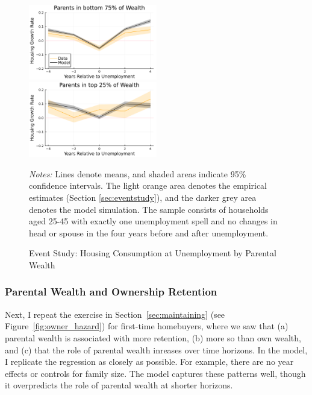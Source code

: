 \documentclass[12pt]{article}
\begin{document}
\begin{figure}[tb]
	\caption{Event Study: Housing Consumption at Unemployment by Parental Wealth}\label{fig:housinggrowthrates_model}
	\includegraphics[width=0.5\textwidth]{../tabfig/model_housinggrowthpoor_both}%
	\includegraphics[width=0.5\textwidth]{../tabfig/model_housinggrowthrich_both}
	
	{\begin{footnotesize} \textit{Notes:} Lines denote means, and shaded areas indicate 95\% confidence intervals. The light orange area denotes the empirical estimates (Section \ref{sec:eventstudy}), and the darker grey area denotes the model simulation. The sample consists of households aged 25-45 with exactly one unemployment spell and no changes in head or spouse in the four years before and after unemployment. \end{footnotesize}}
\end{figure}


\subsubsection{Parental Wealth and Ownership Retention}
Next, I repeat the exercise in Section~\ref{sec:maintaining} (see Figure~\ref{fig:owner_hazard}) for first-time homebuyers, where we saw that (a) parental wealth is associated with more retention, (b) more so than own wealth, and (c) that the role of parental wealth inreases over time horizons. In the model, I replicate the regression as closely as possible. For example, there are no year effects or controls for family size. The model captures these patterns well, though it overpredicts the role of parental wealth at shorter horizons. 
\end{document}
